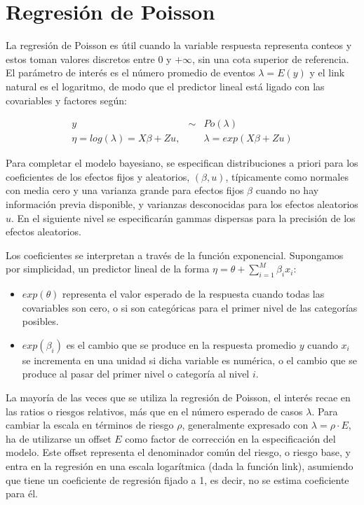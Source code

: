\documentclass[
]{book}
\providecommand{\tightlist}{%
  \setlength{\itemsep}{0pt}\setlength{\parskip}{0pt}}
\begin{document}
\hypertarget{regresiuxf3n-de-poisson}{%
\section{Regresión de Poisson}\label{regresiuxf3n-de-poisson}}

La regresión de Poisson es útil cuando la variable respuesta representa
conteos y estos toman valores discretos entre 0 y \(+\infty\), sin una
cota superior de referencia. El parámetro de interés es el número
promedio de eventos \(\lambda=E(y)\) y el link natural es el logaritmo, de
modo que el predictor lineal está ligado con las covariables y factores
según:

\begin{eqnarray*}
y &\sim& Po(\lambda) \\
\eta=log(\lambda)=X \beta+Zu, && \lambda=exp(X \beta+Zu)
\end{eqnarray*}

Para completar el modelo bayesiano, se especifican distribuciones a priori para los coeficientes de los efectos fijos y aleatorios, \((\beta,u)\), típicamente como normales con media cero y una varianza grande para efectos fijos \(\beta\) cuando no hay información previa disponible, y varianzas desconocidas para los efectos aleatorios \(u\). En el siguiente nivel se especificarán gammas dispersas para la precisión de los efectos aleatorios.

Los coeficientes se interpretan a través de la función exponencial. Supongamos por simplicidad, un predictor lineal de la forma \(\eta=\theta+\sum_{i=1}^M \beta_i x_i\):

\begin{itemize}
\tightlist
\item
  \(exp(\theta)\) representa el valor esperado de la respuesta cuando todas las covariables son cero, o si son categóricas para el primer nivel de las categorías posibles.
\item
  \(exp(\beta_i)\) es el cambio que se produce en la respuesta promedio
  \(y\) cuando \(x_i\) se incrementa en una unidad si dicha variable es numérica, o el cambio que se produce al pasar del primer nivel o categoría al nivel \(i\).
\end{itemize}

La mayoría de las veces que se utiliza la regresión de Poisson, el
interés recae en las ratios o riesgos relativos, más que en el número
esperado de casos \(\lambda\). Para cambiar la escala en términos de
riesgo \(\rho\), generalmente expresado con \(\lambda=\rho \cdot E\), ha de utilizarse un offset \(E\) como factor de corrección en la
especificación del modelo. Este offset representa el denominador común del
riesgo, o riesgo base, y entra en la regresión en una escala logarítmica (dada la función link), asumiendo que tiene un coeficiente de regresión fijado a 1, es decir, no se estima coeficiente para él.
\end{document}
